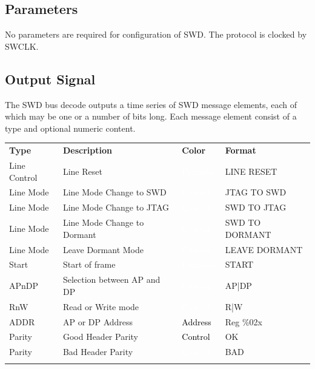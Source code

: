 \subsection{Parameters}

No parameters are required for configuration of SWD. The protocol is clocked by SWCLK.

\subsection{Output Signal}

The SWD bus decode outputs a time series of SWD message elements, each of which may be one or a number of bits long.
Each message element consist of a type and optional numeric content.

\begin{tabularx}{16cm}{lllX}
\thickhline
\textbf{Type} & \textbf{Description} & \textbf{Color} & \textbf{Format} \\
\thickhline
Line Control & Line Reset & \cellcolor{preamble}\textcolor{white}{Preamble} & LINE RESET \\
\thickhline
Line Mode & Line Mode Change to SWD & \cellcolor{control}\textcolor{white}{Control} & JTAG TO SWD \\
\thickhline
Line Mode & Line Mode Change to JTAG & \cellcolor{control}\textcolor{white}{Control} & SWD TO JTAG \\
\thickhline
Line Mode & Line Mode Change to Dormant & \cellcolor{control}\textcolor{white}{Control} & SWD TO DORMANT \\
\thickhline
Line Mode & Leave Dormant Mode & \cellcolor{control}\textcolor{white}{Control} & LEAVE DORMANT \\
\thickhline
Start & Start of frame & \cellcolor{preamble}\textcolor{white}{Preamble} & START \\
\thickhline
APnDP & Selection between AP and DP & \cellcolor{control}\textcolor{white}{Control} & AP|DP  \\
\thickhline
RnW & Read or Write mode & \cellcolor{control}\textcolor{white}{Control} & R|W  \\
\thickhline
ADDR & AP or DP Address & \cellcolor{address}\textcolor{black}{Address} & Reg \%02x \\
\thickhline
Parity & Good Header Parity & \cellcolor{green}\textcolor{black}{Control} & OK  \\
\thickhline
Parity & Bad Header Parity & \cellcolor{red}\textcolor{white}{Control} & BAD  \\
\thickhline

\end{tabularx}
